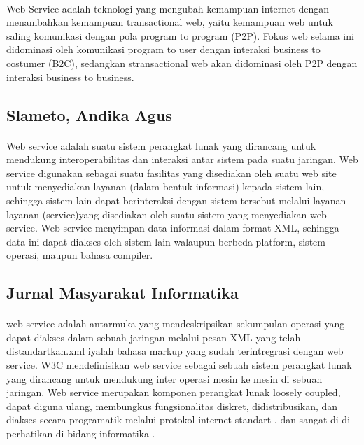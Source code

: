 \documentclass[12pt]{article}
\begin{document}
\paragraph{}
Web Service adalah teknologi yang mengubah kemampuan internet dengan menambahkan kemampuan transactional web, yaitu kemampuan web untuk saling komunikasi dengan pola program to program (P2P). Fokus web selama ini didominasi oleh komunikasi program to user dengan interaksi business to costumer (B2C), sedangkan stransactional web akan didominasi oleh P2P dengan interaksi business to business\cite{fauziah2014aplikasi}.


\subsection{Slameto, Andika Agus}
\paragraph{}
Web service adalah suatu sistem perangkat lunak yang dirancang untuk mendukung interoperabilitas dan interaksi antar sistem pada suatu jaringan. Web service digunakan sebagai suatu fasilitas yang disediakan oleh suatu web site untuk menyediakan layanan (dalam bentuk informasi) kepada sistem lain, sehingga sistem lain dapat berinteraksi dengan sistem tersebut melalui layanan-layanan (service)yang disediakan oleh suatu sistem yang menyediakan web service. Web service menyimpan data informasi dalam format XML, sehingga data ini dapat diakses oleh sistem lain walaupun berbeda platform, sistem operasi, maupun bahasa compiler\cite{slameto2015penerapan}.

\subsection{Jurnal Masyarakat Informatika}
\paragraph{}
web service adalah antarmuka yang mendeskripsikan sekumpulan operasi yang dapat diakses dalam sebuah jaringan melalui pesan XML yang telah distandartkan.xml iyalah bahasa markup yang sudah terintregrasi dengan web service. W3C mendefinisikan web service sebagai sebuah sistem perangkat lunak yang dirancang untuk mendukung inter operasi mesin ke mesin di sebuah jaringan.  Web service merupakan komponen perangkat lunak loosely coupled, dapat diguna ulang, membungkus fungsionalitas diskret, didistribusikan, dan diakses secara programatik melalui protokol internet standart . dan sangat di di perhatikan di bidang informatika \cite{saputra2integrasi}.
\end{document}
